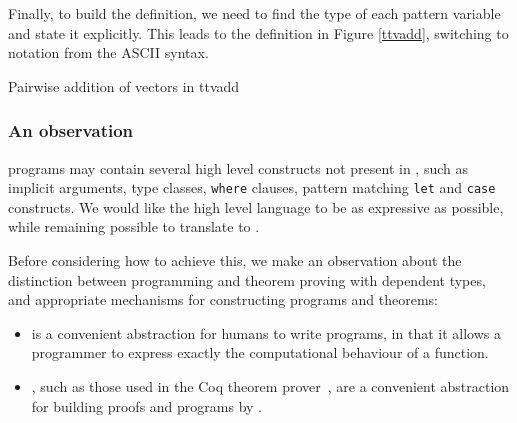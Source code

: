Finally, to build the \TT{} definition, we need to find the type of each pattern variable
and state it explicitly. This leads to the \TT{} definition in Figure \ref{ttvadd}, 
switching to \TT{} notation from the ASCII \Idris{} syntax.

{Pairwise addition of vectors in \TT{}}
{ttvadd}

\subsubsection{An observation}

\Idris{} programs may contain several high level constructs not present in \TT{}, such
as implicit arguments, type classes, \texttt{where} clauses, pattern matching \texttt{let}
and \texttt{case} constructs. We would like the high level language to be as expressive
as possible, while remaining possible to translate to \TT{}.

Before considering how to achieve this, we make an observation about the distinction between
programming and theorem proving with dependent types, and appropriate mechanisms for
constructing programs and theorems:

\begin{itemize}
\item {} is a convenient abstraction for humans to write programs,
in that it allows a programmer to express exactly the computational behaviour of a function.
\item {}, such as those used in the Coq theorem prover~\cite{Bertot2004},
are a convenient abstraction for building proofs and programs by .
\end{itemize}

